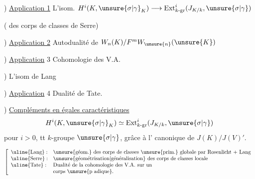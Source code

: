 ) \uline{Application 1} L'isom.
$H^i(K,\unsure{\sigma|\gamma}_K)\longrightarrow\operatorname{Ext}^i_{k\text{-gr}}(J_{K/k},\unsure{\sigma|\gamma})$


( des corps de classes de Serre)

) \uline{Application 2} Autodualité de
$W_n(K)/F^mW_{\unsure{n}}(\unsure{K})$

) \uline{Application} 3 Cohomologie des V.A.

) L'isom de Lang 

) \uline{Application} 4 Dualité de Tate.

) \uline{Compléments en égales caractéristiques}
\[
H^i(K,\unsure{\sigma|\gamma}_K)\simeq\operatorname{Ext}^i_{k\text{-gr}}(J_{K/k},\unsure{\sigma|\gamma})
\]
pour $i>0$, tt $k$-groupe $\unsure{\sigma|\gamma}$, grâce à l'
canonique de $J(K)/J(V)'$.

\[
\left[\begin{array}{ll}
\uline{\text{Lang}}:&\text{\unsure{géom.} des corps de classes \unsure{prim.} globale par Rosenlicht + Lang}\\
\uline{\text{Serre}}:&\text{\unsure{géométrisation|généralisation} des corps de classes locale}\\
\uline{\text{Tate}}:&\text{Dualité de la cohomologie des V.A. sur un}\\
&\text{corps \unsure{p adique}.}
\end{array}\right.
\]

